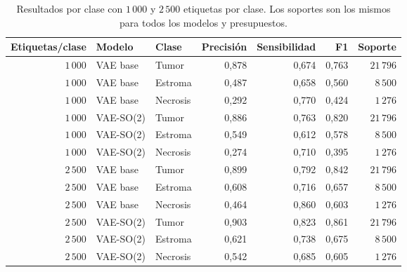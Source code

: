 \begin{table}[htbp]
    \centering
    \caption[Resultados por clase: presupuestos 1000 y 2500.]{Resultados por clase con \(1\,000\) y \(2\,500\) etiquetas por clase. Los soportes son los mismos para todos los modelos y presupuestos.}
    \label{tab:tejido-clases-1000-2500}
    \small
    \begin{tabular}{@{}rllrrrr@{}}
        \toprule
        Etiquetas/clase & Modelo & Clase & Precisión & Sensibilidad & F1 & Soporte \\
        \midrule
        \(1\,000\) & VAE base & Tumor & 0,878 & 0,674 & 0,763 & \(21\,796\) \\
        \(1\,000\) & VAE base & Estroma & 0,487 & 0,658 & 0,560 & \(8\,500\) \\
        \(1\,000\) & VAE base & Necrosis & 0,292 & 0,770 & 0,424 & \(1\,276\) \\
        \(1\,000\) & VAE-SO(2) & Tumor & 0,886 & 0,763 & 0,820 & \(21\,796\) \\
        \(1\,000\) & VAE-SO(2) & Estroma & 0,549 & 0,612 & 0,578 & \(8\,500\) \\
        \(1\,000\) & VAE-SO(2) & Necrosis & 0,274 & 0,710 & 0,395 & \(1\,276\) \\
        \(2\,500\) & VAE base & Tumor & 0,899 & 0,792 & 0,842 & \(21\,796\) \\
        \(2\,500\) & VAE base & Estroma & 0,608 & 0,716 & 0,657 & \(8\,500\) \\
        \(2\,500\) & VAE base & Necrosis & 0,464 & 0,860 & 0,603 & \(1\,276\) \\
        \(2\,500\) & VAE-SO(2) & Tumor & 0,903 & 0,823 & 0,861 & \(21\,796\) \\
        \(2\,500\) & VAE-SO(2) & Estroma & 0,621 & 0,738 & 0,675 & \(8\,500\) \\
        \(2\,500\) & VAE-SO(2) & Necrosis & 0,542 & 0,685 & 0,605 & \(1\,276\) \\
        \bottomrule
    \end{tabular}
\end{table}
